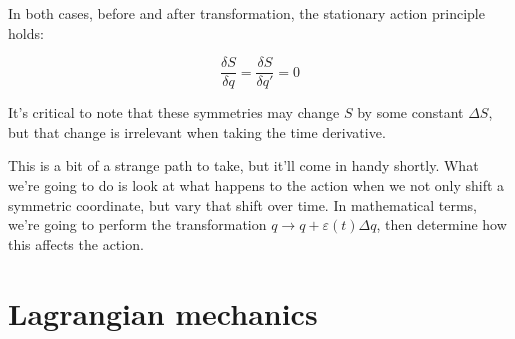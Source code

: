 In both cases, before and after transformation, the stationary action principle holds:

$$\frac{\delta S}{\delta q} = \frac{\delta S}{\delta q'} = 0$$

It's critical to note that these symmetries may change $S$ by some constant $\Delta S$, but that
change is irrelevant when taking the time derivative.

This is a bit of a strange path to take, but it'll come in handy shortly. What we're going to do
is look at what happens to the action when we not only shift a symmetric coordinate, but vary that
shift over time. In mathematical terms, we're going to perform the transformation 
$q \rightarrow q + \varepsilon\left(t\right)\Delta q$, then determine how this affects the action.


\section{Lagrangian mechanics}


